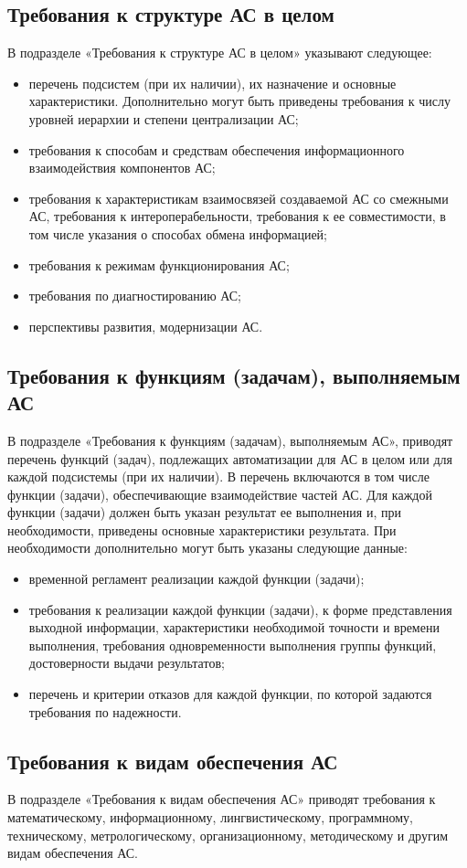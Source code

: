 {\subsection{Требования к структуре АС в целом}
В подразделе «Требования к структуре АС в целом» указывают следующее:
\begin{itemize}
  \item перечень подсистем (при их наличии), их назначение и основные характеристики. Дополнительно могут быть приведены требования к числу уровней иерархии и степени централизации АС;
  \item требования к способам и средствам обеспечения информационного взаимодействия компонентов АС;
  \item требования к характеристикам взаимосвязей создаваемой АС со смежными АС, требования к интероперабельности, требования к ее совместимости, в том числе указания о способах обмена информацией;
  \item требования к режимам функционирования АС;
  \item требования по диагностированию АС;
  \item перспективы развития, модернизации АС.
\end{itemize}
\subsection{Требования к функциям (задачам), выполняемым АС}
В подразделе «Требования к функциям (задачам), выполняемым АС», приводят перечень функций (задач), подлежащих автоматизации для АС в целом или для каждой подсистемы (при их наличии). В перечень включаются в том числе функции  (задачи), обеспечивающие взаимодействие частей АС.
Для каждой функции (задачи) должен быть указан результат ее выполнения и, при необходимости, приведены основные характеристики результата. При необходимости дополнительно могут быть указаны следующие данные:
\begin{itemize}
  \item временной регламент реализации каждой функции (задачи);
  \item требования к реализации каждой функции (задачи), к форме представления выходной информации, характеристики необходимой точности и времени выполнения, требования одновременности выполнения группы функций, достоверности выдачи результатов;
  \item перечень и критерии отказов для каждой функции, по которой задаются требования по надежности.
\end{itemize}
\subsection{Требования к видам обеспечения АС}
В подразделе «Требования к видам обеспечения АС» приводят требования к математическому, информационному, лингвистическому, программному, техническому, метрологическому, организационному, методическому и другим видам обеспечения АС.

}
